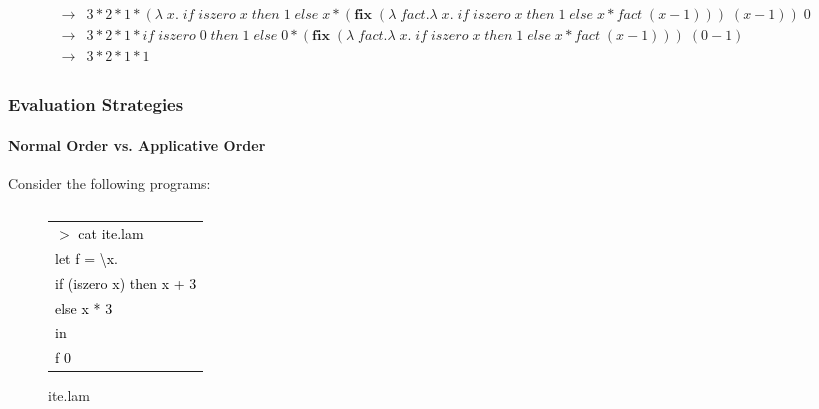\documentclass[xcolor=table]{beamer}
\newcommand{\tab}{\hspace*{1.2em}}
\newcommand{\bs}[1]{\boldsymbol{#1}}
\begin{document}
\begin{frame}
\begin{tiny}
\begin{align*}
\rightarrow & 3 * 2 * 1 * (\lambda \; x. \; if \; iszero \; x \; then \; 1 \; else \; x * (\bs{fix} \; (\lambda \; fact. \lambda \; x. \; if \; iszero \; x \; then \; 1 \; else \; x * fact \; (x-1))) \; (x-1)) \; 0 \; \\
\rightarrow & 3 * 2 * 1 * if \; iszero \; 0 \; then \; 1 \; else \; 0 * (\bs{fix} \; (\lambda \; fact. \lambda \; x. \; if \; iszero \; x \; then \; 1 \; else \; x * fact \; (x-1))) \; (0-1) \\
\rightarrow & 3 * 2 * 1 *  1  \\
\end{align*}
\end{tiny}

\end{frame}


\begin{frame}
\frametitle{Evaluation Strategies}
\framesubtitle{Normal Order vs. Applicative Order}
\begin{block}{Consider the following programs:
  \begin{columns}[t] %
     \begin{column}[T]{5cm} %
          \begin{figure}[h!]
				 \begin{footnotesize}
				 \begin{tabular}{l}
				 \textcolor{black}{
			      $>$ cat ite.lam} \\
			      \textcolor{black}{let f = \textbackslash x.} \\ 
			      \textcolor{black}{\tab  if (iszero x) then x + 3} \\
				  \textcolor{black}{\tab  else x * 3} \\
			      \textcolor{black}{in} \\
			      \textcolor{black}{\tab f 0} \\
			      \end{tabular}	
				 \end{footnotesize}
			  \caption{ite.lam}
		 \end{figure}
     \end{column}
     \begin{column}[T]{5cm} %
		 \begin{figure}[h!]
				\begin{footnotesize}
				\rowcolors{1}{gray}{gray}
			  	\begin{tabular}{l}

\end{tabular}
\end{footnotesize}
\end{figure}
\end{column}
\end{columns}}
\end{block}
\end{frame}
\end{document}

